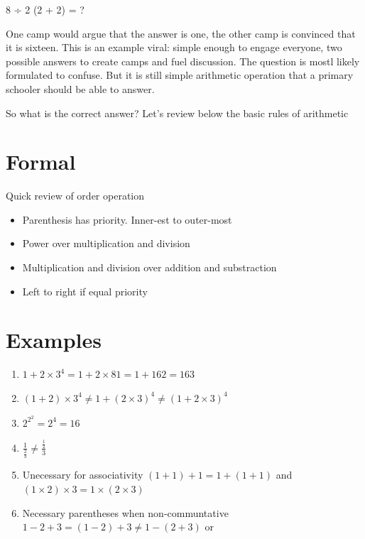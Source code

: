 \documentclass[
  letterpaper,
  DIV=11,
  numbers=noendperiod]{scrreprt}
\providecommand{\tightlist}{%
  \setlength{\itemsep}{0pt}\setlength{\parskip}{0pt}}
\begin{document}
8 ÷ 2 (2 + 2) = ?

One camp would argue that the answer is one, the other camp is convinced
that it is sixteen. This is an example viral: simple enough to engage
everyone, two possible answers to create camps and fuel discussion. The
question is mostl likely formulated to confuse. But it is still simple
arithmetic operation that a primary schooler should be able to answer.

So what is the correct answer? Let's review below the basic rules of
arithmetic

\section*{Formal}\label{formal}


Quick review of order operation

\begin{itemize}
\item
  Parenthesis has priority. Inner-est to outer-most
\item
  Power over multiplication and division
\item
  Multiplication and division over addition and substraction
\item
  Left to right if equal priority
\end{itemize}

\section*{Examples}\label{examples}


\begin{enumerate}
\def\labelenumi{\arabic{enumi}.}
\tightlist
\item
  \(1 + 2 \times 3^4 = 1 + 2 \times 81  = 1 + 162  = 163\)
\item
  \((1 + 2) \times 3^4 \neq 1 + (2 \times 3)^4 \neq (1 + 2 \times 3)^4\)
\item
  \(2^{2^2} = 2^4 = 16\)
\item
  \(\frac{1}{\frac{2}{3}} \neq \frac{\frac{1}{2}}{3}\)
\item
  Unecessary for associativity \((1 + 1) + 1 = 1 + (1 + 1)\) and
  \((1 \times 2) \times 3 = 1 \times (2 \times 3)\)
\item
  Necessary parentheses when non-communtative
  \(1 - 2 + 3 = (1 - 2) + 3 \neq 1 - (2 + 3)\) or
\end{enumerate}
\end{document}
